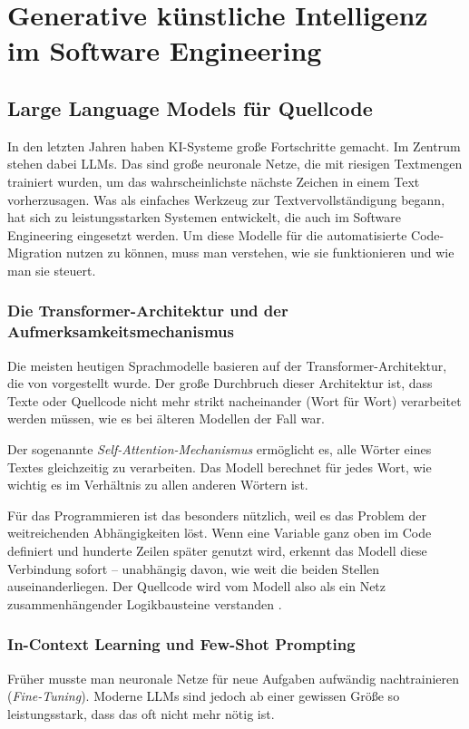 \section{Generative künstliche Intelligenz im Software Engineering}
\subsection{Large Language Models für Quellcode}
\label{subsec:llms_fuer_code}

In den letzten Jahren haben KI-Systeme große Fortschritte gemacht. Im Zentrum stehen dabei \ac{LLMs}. Das sind große neuronale Netze, die mit riesigen Textmengen trainiert wurden, um das wahrscheinlichste nächste Zeichen in einem Text vorherzusagen. Was als einfaches Werkzeug zur Textvervollständigung begann, hat sich zu leistungsstarken Systemen entwickelt, die auch im Software Engineering eingesetzt werden. Um diese Modelle für die automatisierte Code-Migration nutzen zu können, muss man verstehen, wie sie funktionieren und wie man sie steuert.

\subsubsection{Die Transformer-Architektur und der Aufmerksamkeitsmechanismus}
Die meisten heutigen Sprachmodelle basieren auf der Transformer-Architektur, die von \textcite{vaswaniAttentionAllYou2017} vorgestellt wurde. Der große Durchbruch dieser Architektur ist, dass Texte oder Quellcode nicht mehr strikt nacheinander (Wort für Wort) verarbeitet werden müssen, wie es bei älteren Modellen der Fall war.

Der sogenannte \textit{Self-Attention-Mechanismus} ermöglicht es, alle Wörter eines Textes gleichzeitig zu verarbeiten. Das Modell berechnet für jedes Wort, wie wichtig es im Verhältnis zu allen anderen Wörtern ist.

Für das Programmieren ist das besonders nützlich, weil es das Problem der weitreichenden Abhängigkeiten löst. Wenn eine Variable ganz oben im Code definiert und hunderte Zeilen später genutzt wird, erkennt das Modell diese Verbindung sofort – unabhängig davon, wie weit die beiden Stellen auseinanderliegen. Der Quellcode wird vom Modell also als ein Netz zusammenhängender Logikbausteine verstanden \parencite{vaswaniAttentionAllYou2017}.

\subsubsection{In-Context Learning und Few-Shot Prompting}
Früher musste man neuronale Netze für neue Aufgaben aufwändig nachtrainieren (\textit{Fine-Tuning}). Moderne \ac{LLMs} sind jedoch ab einer gewissen Größe so leistungsstark, dass das oft nicht mehr nötig ist.

